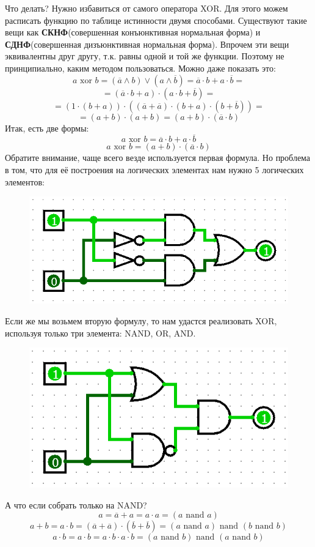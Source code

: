 \begin{itemize}
Что делать? Нужно избавиться от самого оператора XOR. Для этого можем расписать функцию по таблице истинности двумя способами. Существуют такие вещи как \textbf{СКНФ}(совершенная конъюнктивная нормальная форма) и \textbf{СДНФ}(совершенная дизъюнктивная нормальная форма).
Впрочем эти вещи эквивалентны друг другу, т.к. равны одной и той же функции. Поэтому не принципиально, каким методом пользоваться. Можно даже показать это:
\[
a \text{ xor } b = ( \overline{a} \land b ) \lor ( a \land \overline{b} ) = \overline{a} \cdot b + a \cdot \overline{b} =
\]
\[
= ( \overline{a} \cdot b + a ) \cdot ( a \cdot b + \overline{b} ) = 
\]
\[
= (1 \cdot (b + a)) \cdot ((\overline{a} + \overline{a}) \cdot (b + a) \cdot (b + \overline{b})) =
\]
\[
= (a + b) \cdot (a + b) = (a + b) \cdot (\overline{a} \cdot b)
\]
Итак, есть две формы:
\[
a \text{ xor } b = \overline{a} \cdot b + a \cdot \overline{b}
\]
\[
a \text{ xor } b = (a + b) \cdot (\overline{a} \cdot b)
\]
Обратите внимание, чаще всего везде используется первая формула. Но проблема в том, что для её построения на логических элементах нам нужно 5 логических элементов:
\begin{figure}[H]
    \centering
    \includegraphics[width=0.5\linewidth]{Contrexamples/XOR1.png}
\end{figure}
Если же мы возьмем вторую формулу, то нам удастся реализовать XOR, используя только три элемента: NAND, OR, AND.
\begin{figure}[H]
    \centering
    \includegraphics[width=0.5\linewidth]{Contrexamples/XOR2.png}
\end{figure}
А что если собрать только на NAND?
\[
a = \overline{a} + a = a \cdot a = (a \text{ nand } a)
\]
\[
a + b = a \cdot b = (\overline{a} + \overline{a}) \cdot (\overline{b} + \overline{b}) = (a \text{ nand } a) \text{ nand } (b \text{ nand } b)
\]
\[
a \cdot b = a \cdot b = a \cdot b \cdot a \cdot b = (a \text{ nand } b) \text{ nand } (a \text{ nand } b)
\]
\end{itemize}
